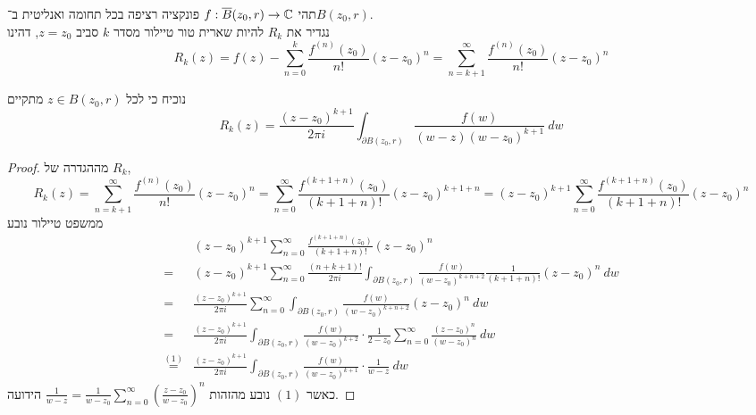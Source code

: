 \question{}
תהי $f : \overline{B}(z_0, r) \to \mathbb{C}$ פונקציה רציפה בכל תחומה ואנליטית ב־$B(z_0, r)$. \\
נגדיר את $R_k$ להיות שארית טור טיילור מסדר $k$ סביב $z = z_0$, דהינו
\[
	R_k(z)
	= f(z) - \sum_{n = 0}^{k} \frac{f^{(n)}(z_0)}{n!} {(z - z_0)}^n
	= \sum_{n = k + 1}^{\infty} \frac{f^{(n)}(z_0)}{n!} {(z - z_0)}^n
\]

\subquestion{}
נוכיח כי לכל $z \in B(z_0, r)$ מתקיים
\[
	R_k(z)
	= \frac{{(z - z_0)}^{k + 1}}{2\pi i} \int_{\partial B(z_0, r)} \frac{f(w)}{(w - z){(w - z_0)}^{k + 1}}\ dw
\]
\begin{proof}
	מההגדרה של $R_k$,
	\[
		R_k(z)
		= \sum_{n = k + 1}^{\infty} \frac{f^{(n)}(z_0)}{n!} {(z - z_0)}^n
		= \sum_{n = 0}^{\infty} \frac{f^{(k + 1 + n)}(z_0)}{(k + 1 + n)!} {(z - z_0)}^{k + 1 + n}
		= {(z - z_0)}^{k + 1} \sum_{n = 0}^{\infty} \frac{f^{(k + 1 + n)}(z_0)}{(k + 1 + n)!} {(z - z_0)}^n
	\]
	ממשפט טיילור נובע
	\begin{align*}
		& {(z - z_0)}^{k + 1} \sum_{n = 0}^{\infty} \frac{f^{(k + 1 + n)}(z_0)}{(k + 1 + n)!} {(z - z_0)}^n \\
		= & {(z - z_0)}^{k + 1} \sum_{n = 0}^{\infty} \frac{(n + k + 1)!}{2\pi i} \int_{\partial B(z_0, r)} \frac{f(w)}{{(w - z_0)}^{k + n + 2}} \frac{1}{(k + 1 + n)!} {(z - z_0)}^n\ dw \\
		= & \frac{{(z - z_0)}^{k + 1}}{2\pi i} \sum_{n = 0}^{\infty} \int_{\partial B(z_0, r)} \frac{f(w)}{{(w - z_0)}^{k + n + 2}} {(z - z_0)}^n\ dw \\
		= & \frac{{(z - z_0)}^{k + 1}}{2\pi i} \int_{\partial B(z_0, r)} \frac{f(w)}{{(w - z_0)}^{k + 2}} \cdot \frac{1}{2 - z_0} \sum_{n = 0}^{\infty} \frac{{(z - z_0)}^n}{{(w - z_0)}^n}\ dw \\
		\overset{(1)}{=} & \frac{{(z - z_0)}^{k + 1}}{2\pi i} \int_{\partial B(z_0, r)} \frac{f(w)}{{(w - z_0)}^{k + 1}} \cdot \frac{1}{w - z}\ dw
	\end{align*}
	כאשר $(1)$ נובע מהזהות $\frac{1}{w - z} = \frac{1}{w - z_0} \sum_{n = 0}^{\infty} {\left(\frac{z - z_0}{w - z_0}\right)}^n$ הידועה.
\end{proof}

